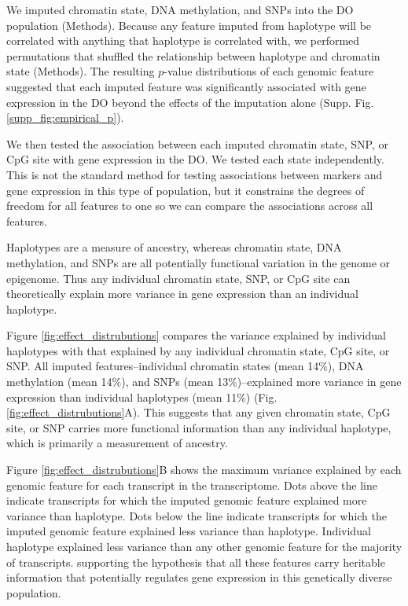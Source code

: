 \documentclass[
  11pt,
]{article}
\begin{document}
We imputed chromatin state, DNA methylation, and SNPs into the DO
population (Methods). Because any feature imputed from haplotype will be
correlated with anything that haplotype is correlated with, we performed
permutations that shuffled the relationship between haplotype and
chromatin state (Methods). The resulting \(p\)-value distributions of
each genomic feature suggested that each imputed feature was
significantly associated with gene expression in the DO beyond the
effects of the imputation alone (Supp. Fig. \ref{supp_fig:empirical_p}).

We then tested the association between each imputed chromatin state,
SNP, or CpG site with gene expression in the DO. We tested each state
independently. This is not the standard method for testing associations
between markers and gene expression in this type of population, but it
constrains the degrees of freedom for all features to one so we can
compare the associations across all features.

Haplotypes are a measure of ancestry, whereas chromatin state, DNA
methylation, and SNPs are all potentially functional variation in the
genome or epigenome. Thus any individual chromatin state, SNP, or CpG
site can theoretically explain more variance in gene expression than an
individual haplotype.

Figure \ref{fig:effect_distrubutions} compares the variance explained by
individual haplotypes with that explained by any individual chromatin
state, CpG site, or SNP. All imputed features--individual chromatin
states (mean 14\%), DNA methylation (mean 14\%), and SNPs (mean
13\%)--explained more variance in gene expression than individual
haplotypes (mean 11\%) (Fig. \ref{fig:effect_distrubutions}A). This
suggests that any given chromatin state, CpG site, or SNP carries more
functional information than any individual haplotype, which is primarily
a measurement of ancestry.

Figure \ref{fig:effect_distrubutions}B shows the maximum variance
explained by each genomic feature for each transcript in the
transcriptome. Dots above the line indicate transcripts for which the
imputed genomic feature explained more variance than haplotype. Dots
below the line indicate transcripts for which the imputed genomic
feature explained less variance than haplotype. Individual haplotype
explained less variance than any other genomic feature for the majority
of transcripts. supporting the hypothesis that all these features carry
heritable information that potentially regulates gene expression in this
genetically diverse population.
\end{document}
